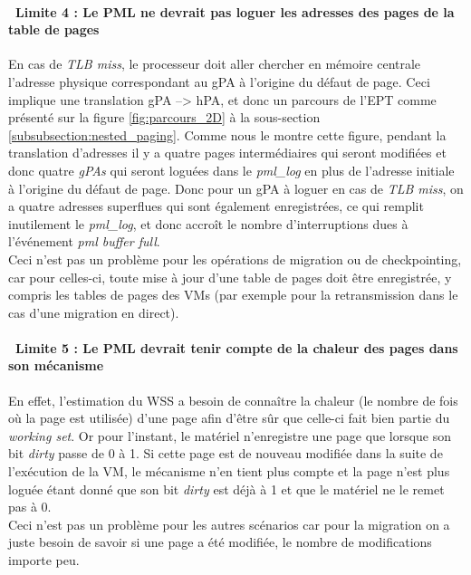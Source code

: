 \paragraph{\textbullet\ \textbf{Limite 4 : Le PML ne devrait pas loguer les adresses des pages de la table de pages}}
\par\noindent
\par\noindent En cas de \textit{TLB miss}, le processeur doit aller chercher en mémoire centrale l'adresse physique correspondant au gPA à l'origine du défaut de page. Ceci implique une translation gPA --> hPA, et donc un parcours de l'EPT comme présenté sur la figure \ref{fig:parcours_2D} à la sous-section \ref{subsubsection:nested_paging}. Comme nous le montre cette figure, pendant la translation d'adresses il y a quatre pages intermédiaires qui seront modifiées et donc quatre \textit{\acl{gPA}s} qui seront loguées dans le \textit{pml\_log} en plus de l'adresse initiale à l'origine du défaut de page. Donc pour un gPA à loguer en cas de \textit{TLB miss}, on a quatre adresses superflues qui sont également enregistrées, ce qui remplit inutilement le \textit{pml\_log}, et donc accroît le nombre d'interruptions dues à l'événement \textit{pml buffer full}.\\
Ceci n'est pas un problème pour les opérations de migration ou de checkpointing, car pour celles-ci, toute mise à jour d'une table de pages doit être enregistrée, y compris les tables de pages des VMs (par exemple pour la retransmission dans le cas d'une migration en direct). 

\paragraph{\textbullet\ \textbf{Limite 5 : Le PML devrait tenir compte de la chaleur des pages dans son mécanisme}}
\par\noindent
\par\noindent En effet, l'estimation du WSS a besoin de connaître la chaleur (le nombre de fois où la page est utilisée) d'une page afin d'être sûr que celle-ci fait bien partie du \textit{working set}. Or pour l'instant, le matériel n'enregistre une page que lorsque son bit \textit{dirty} passe de 0 à 1. Si cette page est de nouveau modifiée dans la suite de l'exécution de la VM, le mécanisme n'en tient plus compte et la page n'est plus loguée étant donné que son bit \textit{dirty} est déjà à 1 et que le matériel ne le remet pas à 0.\\
Ceci n'est pas un problème pour les autres scénarios car pour la migration on a juste besoin de savoir si une page a été modifiée, le nombre de modifications importe peu.

